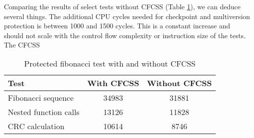 Comparing the results of select tests without CFCSS (Table \ref{tab:cfcss_nocfcss}), we can deduce several things. The additional CPU cycles needed for checkpoint and multiversion protection is between 1000 and 1500 cycles. This is a constant increase and should not scale with the control flow complexity or instruction size of the tests. The CFCSS 

\begin{table}[h]
\centering
\begin{tabular}{|l|c|c|}
\hline
\textbf{Test} & \textbf{With CFCSS} & \textbf{Without CFCSS} \\
\hline
Fibonacci sequence & 34983 & 31881 \\
Nested function calls & 13126 & 11828 \\
CRC calculation & 10614 & 8746 \\

\hline
\end{tabular}
\caption{Protected fibonacci test with and without CFCSS}
\label{tab:cfcss_nocfcss}
\end{table}